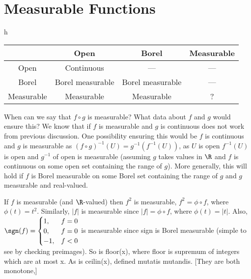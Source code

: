 \newpage
\section{Measurable Functions}











	\begin{table}{h}
	\begin{tabular}{|c|c|c|c|} \hline
	\diagbox{is}{(*)} & Open & Borel & Measurable \\ \hline
	Open & Continuous & --- & --- \\ \hline
	Borel & Borel measurable & Borel measurable & --- \\ \hline
	Measurable & Measurable & Measurable & ? \\ \hline
	\end{tabular}
	\end{table}



When can we say that $f \circ g$ is measurable? What data about $f$ and $g$ would ensure this? 
We know that if $f$ is measurable and $g$ is continuous does not work from previous discussion. One possibility ensuring this would be $f$ is continuous and $g$ is measurable as $(f \circ g)^{-1}(U)= g^{-1}(f^{-1}(U))$, as $U$ is open $f^{-1}(U)$ is open and $g^{-1}$ of open is measurable (assuming $g$ takes values in $\R$ and $f$ is continuous on some open set containing the range of $g$). More generally, this will hold if $f$ is Borel measurable on some Borel set containing the range of $g$ and $g$ measurable and real-valued. 


\begin{ex}
If $f$ is measurable (and $\R$-valued) then $f^2$ is measurable, $f^2= \phi \circ f$, where $\phi(t)=t^2$. Similarly, $|f|$ is measurable since $|f|= \phi \circ f$, where $\phi(t)=|t|$. Also, $\sgn(f) = \begin{cases} 1, & f=0 \\ 0, & f=0 \\ -1, & f<0 \end{cases}$ is measurable since sign is Borel measurable (simple to see by checking preimages). So is floor(x), where floor is supremum of integers which are at most x. As is ceilin(x), defined mutatis mutandis. [They are both monotone,]

\end{ex}


